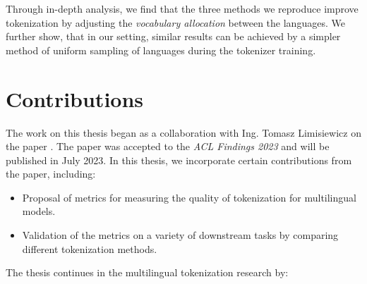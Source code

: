 
Through in-depth analysis, we find that the three methods we reproduce \cite{chung_improving_2020,zheng_allocating_2021,liang_xlm-v_2023} improve tokenization by adjusting the \textit{vocabulary allocation} between the languages. We further show, that in our setting, similar results can be achieved by a simpler method of uniform sampling of languages during the tokenizer training. 

\section{Contributions}

The work on this thesis began as a collaboration with Ing. Tomasz Limisiewicz on the paper . The paper was accepted to the \textit{ACL Findings 2023} and will be published in July 2023. In this thesis, we incorporate certain contributions from the paper, including:

\begin{itemize}
    \item Proposal of metrics for measuring the quality of tokenization for multilingual models.
    \item Validation of the metrics on a variety of downstream tasks by comparing different tokenization methods.
\end{itemize}

The thesis continues in the multilingual tokenization research by:

